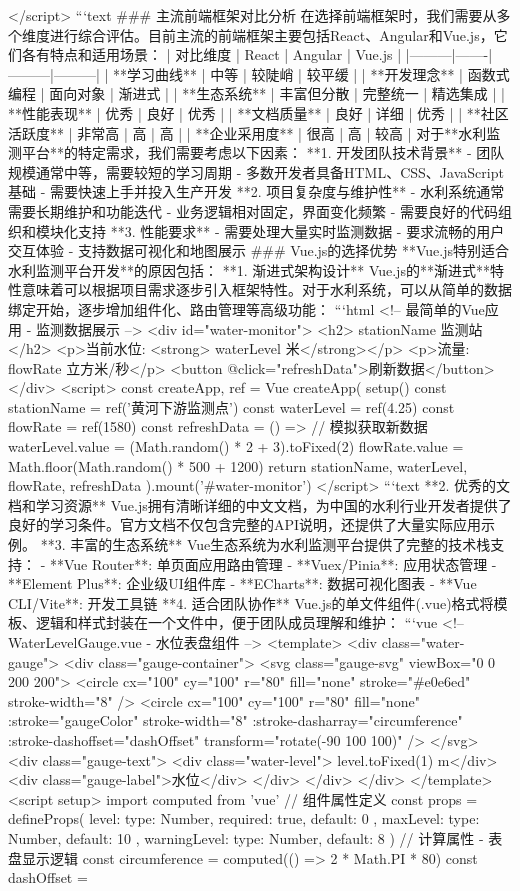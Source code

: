 {{{{{</script> ```text ### 主流前端框架对比分析 在选择前端框架时，我们需要从多个维度进行综合评估。目前主流的前端框架主要包括React、Angular和Vue.js，它们各有特点和适用场景： | 对比维度 | React | Angular | Vue.js | |---------|-------|---------|---------| | **学习曲线** | 中等 | 较陡峭 | 较平缓 | | **开发理念** | 函数式编程 | 面向对象 | 渐进式 | | **生态系统** | 丰富但分散 | 完整统一 | 精选集成 | | **性能表现** | 优秀 | 良好 | 优秀 | | **文档质量** | 良好 | 详细 | 优秀 | | **社区活跃度** | 非常高 | 高 | 高 | | **企业采用度** | 很高 | 高 | 较高 | 对于**水利监测平台**的特定需求，我们需要考虑以下因素： **1. 开发团队技术背景** - 团队规模通常中等，需要较短的学习周期 - 多数开发者具备HTML、CSS、JavaScript基础 - 需要快速上手并投入生产开发 **2. 项目复杂度与维护性** - 水利系统通常需要长期维护和功能迭代 - 业务逻辑相对固定，界面变化频繁 - 需要良好的代码组织和模块化支持 **3. 性能要求** - 需要处理大量实时监测数据 - 要求流畅的用户交互体验 - 支持数据可视化和地图展示 ### Vue.js的选择优势 **Vue.js特别适合水利监测平台开发**的原因包括： **1. 渐进式架构设计** Vue.js的**渐进式**特性意味着可以根据项目需求逐步引入框架特性。对于水利系统，可以从简单的数据绑定开始，逐步增加组件化、路由管理等高级功能： ```html <!-- 最简单的Vue应用 - 监测数据展示 --> <div id="water-monitor"> <h2>{{ stationName }}监测站</h2> <p>当前水位: <strong>{{ waterLevel }}米</strong></p> <p>流量: {{ flowRate }}立方米/秒</p> <button @click="refreshData">刷新数据</button> </div> <script> const { createApp, ref } = Vue createApp({ setup() { const stationName = ref('黄河下游监测点') const waterLevel = ref(4.25) const flowRate = ref(1580) const refreshData = () => { // 模拟获取新数据 waterLevel.value = (Math.random() * 2 + 3).toFixed(2) flowRate.value = Math.floor(Math.random() * 500 + 1200) } return { stationName, waterLevel, flowRate, refreshData } } }).mount('#water-monitor') </script> ```text **2. 优秀的文档和学习资源** Vue.js拥有清晰详细的中文文档，为中国的水利行业开发者提供了良好的学习条件。官方文档不仅包含完整的API说明，还提供了大量实际应用示例。 **3. 丰富的生态系统** Vue生态系统为水利监测平台提供了完整的技术栈支持： - **Vue Router**: 单页面应用路由管理 - **Vuex/Pinia**: 应用状态管理 - **Element Plus**: 企业级UI组件库 - **ECharts**: 数据可视化图表 - **Vue CLI/Vite**: 开发工具链 **4. 适合团队协作** Vue.js的单文件组件(.vue)格式将模板、逻辑和样式封装在一个文件中，便于团队成员理解和维护： ```vue <!-- WaterLevelGauge.vue - 水位表盘组件 --> <template> <div class="water-gauge"> <div class="gauge-container"> <svg class="gauge-svg" viewBox="0 0 200 200"> <circle cx="100" cy="100" r="80" fill="none" stroke="#e0e6ed" stroke-width="8" /> <circle cx="100" cy="100" r="80" fill="none" :stroke="gaugeColor" stroke-width="8" :stroke-dasharray="circumference" :stroke-dashoffset="dashOffset" transform="rotate(-90 100 100)" /> </svg> <div class="gauge-text"> <div class="water-level">{{ level.toFixed(1) }}m</div> <div class="gauge-label">水位</div> </div> </div> </div> </template> <script setup> import { computed } from 'vue' // 组件属性定义 const props = defineProps({ level: { type: Number, required: true, default: 0 }, maxLevel: { type: Number, default: 10 }, warningLevel: { type: Number, default: 8 } }) // 计算属性 - 表盘显示逻辑 const circumference = computed(() => 2 * Math.PI * 80) const dashOffset = }}}}}
